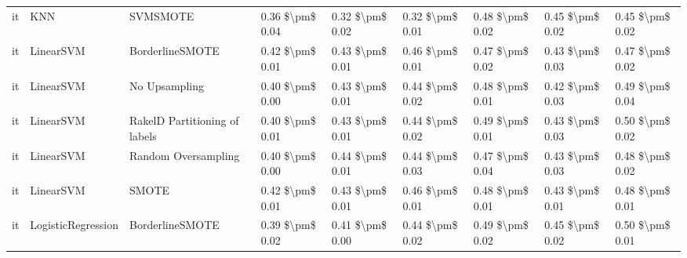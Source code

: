 \begin{tabular}{lllllllll}
      it &                             KNN &                      SVMSMOTE & 0.36 \$\textbackslash pm\$ 0.04 &           0.32 \$\textbackslash pm\$ 0.02 &       0.32 \$\textbackslash pm\$ 0.01 &        0.48 \$\textbackslash pm\$ 0.02 &                         0.45 \$\textbackslash pm\$ 0.02 &     0.45 \$\textbackslash pm\$ 0.02 \\
      it &                       LinearSVM &               BorderlineSMOTE & 0.42 \$\textbackslash pm\$ 0.01 &           0.43 \$\textbackslash pm\$ 0.01 &       0.46 \$\textbackslash pm\$ 0.01 &        0.47 \$\textbackslash pm\$ 0.02 &                         0.43 \$\textbackslash pm\$ 0.03 &     0.47 \$\textbackslash pm\$ 0.02 \\
      it &                       LinearSVM &                 No Upsampling & 0.40 \$\textbackslash pm\$ 0.00 &           0.43 \$\textbackslash pm\$ 0.01 &       0.44 \$\textbackslash pm\$ 0.02 &        0.48 \$\textbackslash pm\$ 0.01 &                         0.42 \$\textbackslash pm\$ 0.03 &     0.49 \$\textbackslash pm\$ 0.04 \\
      it &                       LinearSVM & RakelD Partitioning of labels & 0.40 \$\textbackslash pm\$ 0.01 &           0.43 \$\textbackslash pm\$ 0.01 &       0.44 \$\textbackslash pm\$ 0.02 &        0.49 \$\textbackslash pm\$ 0.01 &                         0.43 \$\textbackslash pm\$ 0.03 &     0.50 \$\textbackslash pm\$ 0.02 \\
      it &                       LinearSVM &           Random Oversampling & 0.40 \$\textbackslash pm\$ 0.00 &           0.44 \$\textbackslash pm\$ 0.01 &       0.44 \$\textbackslash pm\$ 0.03 &        0.47 \$\textbackslash pm\$ 0.04 &                         0.43 \$\textbackslash pm\$ 0.03 &     0.48 \$\textbackslash pm\$ 0.02 \\
      it &                       LinearSVM &                         SMOTE & 0.42 \$\textbackslash pm\$ 0.01 &           0.43 \$\textbackslash pm\$ 0.01 &       0.46 \$\textbackslash pm\$ 0.01 &        0.48 \$\textbackslash pm\$ 0.01 &                         0.43 \$\textbackslash pm\$ 0.01 &     0.48 \$\textbackslash pm\$ 0.01 \\
      it &              LogisticRegression &               BorderlineSMOTE & 0.39 \$\textbackslash pm\$ 0.02 &           0.41 \$\textbackslash pm\$ 0.00 &       0.44 \$\textbackslash pm\$ 0.02 &        0.49 \$\textbackslash pm\$ 0.02 &                         0.45 \$\textbackslash pm\$ 0.02 &     0.50 \$\textbackslash pm\$ 0.01 \\

\end{tabular}
